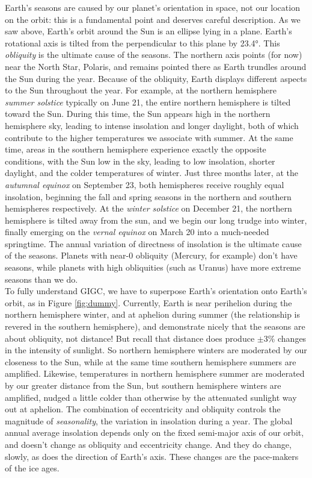 \documentclass[amstex,12pt]{book}
\begin{document}
Earth's seasons are caused by our planet's orientation in space, not our location on the orbit: this is a fundamental point and deserves careful description. As we saw above, Earth's orbit around the Sun is an ellipse lying in a plane. Earth's rotational axis is tilted from the perpendicular to this plane by \ang{23.4}. This \emph{obliquity} is the ultimate cause of the seasons. The northern axis points (for now) near the North Star, Polaris, and remains pointed there as Earth trundles around the Sun during the year. Because of the obliquity, Earth displays different aspects to the Sun throughout the year. For example, at the northern hemisphere \emph{summer solstice} typically on June 21, the entire northern hemisphere is tilted toward the Sun. During this time, the Sun appears high in the northern hemisphere sky, leading to intense insolation and longer daylight, both of which contribute to the higher temperatures we associate with summer. At the same time, areas in the southern hemisphere experience exactly the opposite conditions, with the Sun low in the sky, leading to low insolation, shorter daylight, and the colder temperatures of winter. Just three months later, at the \emph{autumnal equinox} on September 23, both hemispheres receive roughly equal insolation, beginning the fall and spring seasons in the northern and southern hemispheres respectively. At the \emph{winter solstice} on December 21, the northern hemisphere is tilted away from the sun, and we begin our long trudge into winter, finally emerging on the \emph{vernal equinox} on March 20 into a much-needed springtime. The annual variation of directness of insolation is the ultimate cause of the seasons. Planets with near-0 obliquity (Mercury, for example) don't have seasons, while planets with high obliquities (such as Uranus) have more extreme seasons than we do.\\  

To fully understand GIGC, we have to superpose Earth's orientation onto Earth's orbit, as in Figure \ref{fig:dummy}. Currently, Earth is near perihelion during the northern hemisphere winter, and at aphelion during summer (the relationship is revered in the southern hemisphere), and demonstrate nicely that the seasons are about obliquity, not distance! But recall that distance does produce $\pm 3\%$ changes in the intensity of sunlight. So northern hemisphere winters are moderated by our closeness to the Sun, while at the same time southern hemisphere summers are amplified. Likewise, temperatures in northern hemisphere summer are moderated by our greater distance from the Sun, but southern hemisphere winters are amplified, nudged a little colder than otherwise by the attenuated sunlight way out at aphelion. The combination of eccentricity and obliquity controls the magnitude of \emph{seasonality}, the variation in insolation during a year. The global annual average insolation depends only on the fixed semi-major axis of our orbit, and doesn't change as obliquity and eccentricity change. And they do change, slowly, as does the direction of Earth's axis. These changes are the pace-makers of the ice ages.\\
\end{document}
